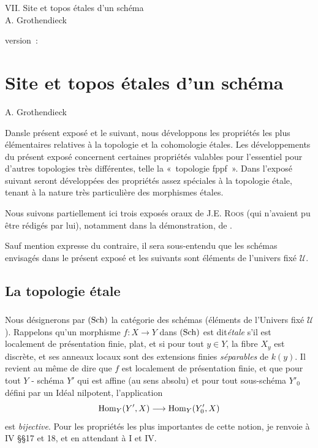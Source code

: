 \documentclass[10pt]{../fichiers-configuration-latex/smfart}
\begin{document}
\begin{center}
VII. Site et topos étales d'un schéma\\
A. Grothendieck
\end{center}

version : \showgitstatus{}
\tableofcontents

\else
\chapter{Site et topos étales d'un schéma}
\begin{center}
A. Grothendieck
\end{center}
\fi

\setcounter{pageoriginal}{341}

Dans\pageoriginale le présent exposé et le suivant, nous
développons
les propriétés les plus élémentaires relatives à la
topologie et la cohomologie
étales. Les développements du présent exposé
concernent certaines
propriétés valables pour l'essentiel pour d'autres topologies très
différentes, telle la « topologie fppf ». Dans l'exposé suivant
seront développées des propriétés assez spéciales
à la topologie
étale, tenant à la nature très particulière des morphismes
étales.

Nous suivons partiellement ici trois exposés oraux de J.E. \textsc{Roos} (qui
n'avaient pu être rédigés par lui), notamment dans la démonstration,
de .

Sauf mention expresse du contraire, il sera sous-entendu que les
schémas envisagés dans le présent exposé et les suivants sont éléments
de l'univers fixé $𝒰$.

\section{La topologie étale}

\subsection{}

Nous désignerons par $(\operatorname{Sch})$ la catégorie des schémas (éléments de
l'Univers fixé $𝒰$). Rappelons qu'un morphisme $f : X \to Y$ dans
$(\operatorname{Sch})$ est dit\pageoriginale \emph{étale} s'il est localement de présentation
finie, plat, et si pour tout $y \in Y$, la fibre $X_y$ est discrète,
et ses anneaux locaux sont des extensions finies \emph{séparables} de
$k(y)$. Il revient au même de dire que $f$ est localement de
présentation finie, et que pour tout $Y$ - schéma $Y'$ qui est affine
(au sens absolu) et pour tout sous-schéma $Y'_{0}$ défini par un Idéal
nilpotent, l'application
$$
\Hom_Y (Y', X) \to \Hom_Y (Y'_{0}, X)
$$
est \emph{bijective}. Pour les propriétés les plus importantes de
cette notion, je renvoie à \EGA IV \S\S 17 et 18, et en attendant à
 I et IV.
\end{document}
